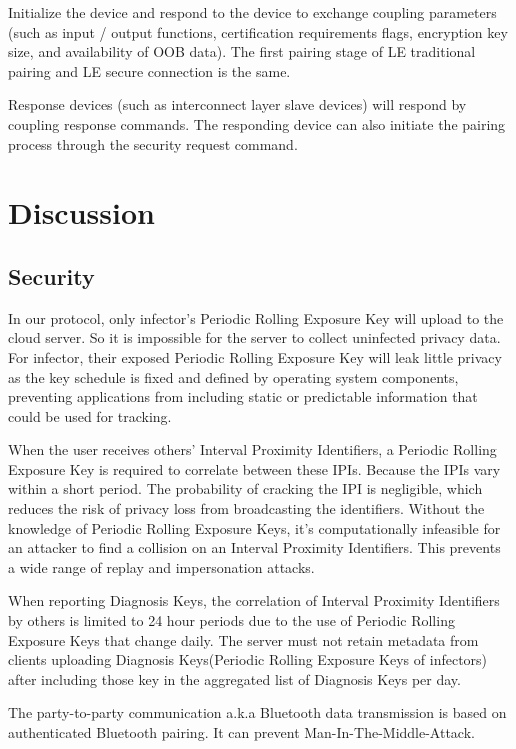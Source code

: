 \documentclass[11pt,en]{elegantpaper}
\begin{document}
Initialize the device and respond to the device to exchange coupling parameters (such as input / output functions, certification requirements flags, encryption key size, and availability of OOB data). The first pairing stage of LE traditional pairing and LE secure connection is the same.

Response devices (such as interconnect layer slave devices) will respond by coupling response commands. The responding device can also initiate the pairing process through the security request command.

\section{Discussion}
\subsection{Security}
In our protocol, only infector's Periodic Rolling Exposure Key will upload to the cloud server. So it is impossible for the server to collect uninfected privacy data. For infector, their exposed Periodic Rolling Exposure Key will leak little privacy as the key schedule is fixed and defined by operating system components, preventing applications from including static or predictable information that could be used for tracking. 

When the user receives others' Interval Proximity Identifiers, a Periodic Rolling Exposure Key is required to correlate between these IPIs. Because the IPIs vary within a short period. The probability of cracking the  IPI  is negligible, which reduces the risk of privacy loss from broadcasting the identifiers. Without the knowledge of Periodic Rolling Exposure Keys, it's computationally infeasible for an attacker to find a collision on an Interval Proximity Identifiers. This prevents a wide range of replay and impersonation attacks. 

When reporting Diagnosis Keys, the correlation of Interval Proximity Identifiers by others is limited to 24 hour periods due to the use of Periodic Rolling Exposure Keys that change daily. The server must not retain metadata from clients uploading Diagnosis Keys(Periodic Rolling Exposure Keys of infectors) after including those key in the aggregated list of Diagnosis Keys per day.

The party-to-party communication a.k.a Bluetooth data transmission is based on authenticated Bluetooth pairing. It can prevent Man-In-The-Middle-Attack. 
\end{document}
